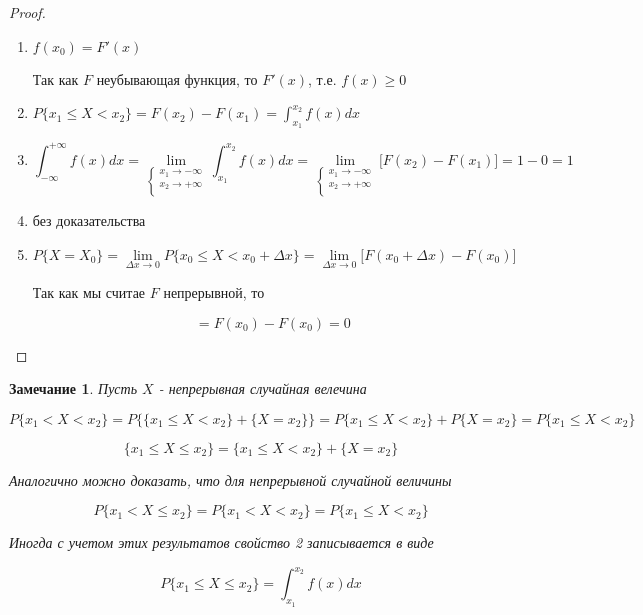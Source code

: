 \documentclass[a4paper, 14pt]{report}
\newtheorem{note}{Замечание}[section]
\begin{document}
\begin{proof}
    \begin{enumerate}
        \item $f(x_0) = F'(x)$

            Так как $F$ неубывающая функция, то $F'(x)$, т.е. $f(x) \geq 0$

        \item $P\{x_1 \le X < x_2\} = F(x_2) - F(x_1) = \int_{x_1}^{x_2} f(x) dx$

        \item 
            $$
            \int_{-\infty}^{+\infty} f(x) dx = \lim_{
            \begin{cases}
                x_1 \to -\infty \\
                x_2 \to + \infty \\
            \end{cases}
        } \int_{x_1}^{x_2} f(x) dx = \lim_{
            \begin{cases}
                x_1 \to -\infty \\
                x_2 \to + \infty \\
            \end{cases}
        } \big[ F(x_2) - F(x_1) \big] = 1-0 = 1
            $$

        \item без доказательства

        \item 
            $$
            P\{X=X_0\} = \lim_{\Delta x \to 0} P\{x_0 \le X < x_0 + \Delta x\} =
            \lim_{\Delta x \to 0} \big[ F(x_0 + \Delta x) - F(x_0) \big]
            $$

            Так как мы считае $F$ непрерывной, то

            $$
            = F(x_0) - F(x_0) = 0
            $$
    \end{enumerate}
\end{proof}

\begin{note}
    Пусть $X$ - непрерывная случайная велечина

    $$
    P\{x_1 < X < x_2\} =
    P\{\{ x_1 \le X < x_2\} + \{X=x_2\}\} = P\{x_1 \le X < x_2\} + P\{X=x_2\} = P\{x_1 \le X < x_2\}
    $$

    $$
    \{x_1 \le X \le x_2\} = \{x_1 \le X < x_2\} + \{X = x_2\}
    $$

    Аналогично можно доказать, что для непрерывной случайной величины

    $$
    P\{ x_1 < X \le x_2\} = P\{x_1 < X < x_2\} = P\{x_1 \le X < x_2\}
    $$

    Иногда с учетом этих результатов свойство 2 записывается в виде

    $$
    P\{x_1 \le X \le x_2\} = \int_{x_1}^{x_2} f(x) dx
    $$
\end{note}
\end{document}
